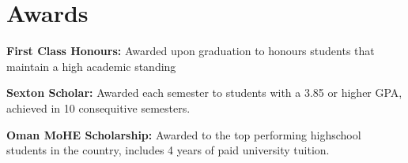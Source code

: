 \documentclass[letterpaper,11pt]{article}
\begin{document}
\section{Awards}
 \begin{itemize}[leftmargin=0.15in, label={}]
    \small{\item{
   
		 \textbf{First Class Honours:} {Awarded upon graduation to honours students that maintain a high academic standing}

     \textbf{Sexton Scholar:}{ Awarded each semester to students with a 3.85 or higher GPA, achieved in 10 consequitive semesters.}
    
    \textbf{Oman MoHE Scholarship:}{ Awarded to the top performing highschool students in the country, includes 4 years of paid university tuition.}
    }}
 \end{itemize}



\end{document}
